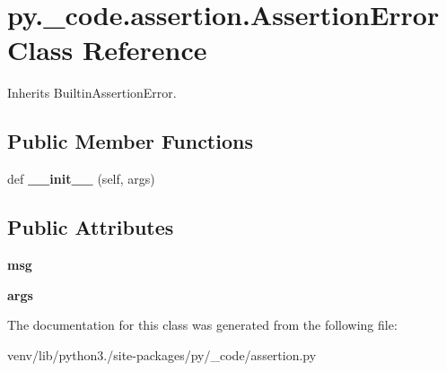 \hypertarget{classpy_1_1__code_1_1assertion_1_1_assertion_error}{}\section{py.\+\_\+code.\+assertion.\+Assertion\+Error Class Reference}
\label{classpy_1_1__code_1_1assertion_1_1_assertion_error}


Inherits Builtin\+Assertion\+Error.

\subsection*{Public Member Functions}
\begin{DoxyCompactItemize}
\item 
\mbox{\label{classpy_1_1__code_1_1assertion_1_1_assertion_error_a669ce88e1405842ca1130b9f0c128847}} 
def {\bfseries \+\_\+\+\_\+init\+\_\+\+\_\+} (self, args)
\end{DoxyCompactItemize}
\subsection*{Public Attributes}
\begin{DoxyCompactItemize}
\item 
\mbox{\label{classpy_1_1__code_1_1assertion_1_1_assertion_error_a99039e0e3fc1e06b4eefa35f8e42ae62}} 
{\bfseries msg}
\item 
\mbox{\label{classpy_1_1__code_1_1assertion_1_1_assertion_error_ad4511f8e44f79023ad2e0c05132363fe}} 
{\bfseries args}
\end{DoxyCompactItemize}


The documentation for this class was generated from the following file\+:\begin{DoxyCompactItemize}
\item 
venv/lib/python3./site-\/packages/py/\+\_\+code/assertion.\+py\end{DoxyCompactItemize}
